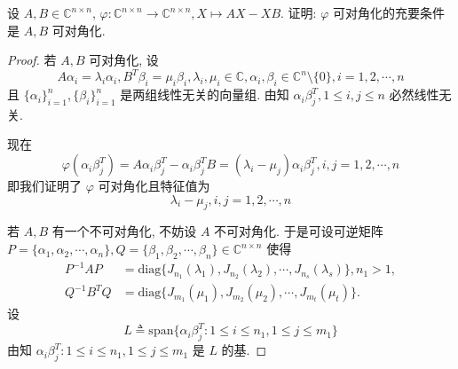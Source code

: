 \documentclass[../../main.tex]{subfiles}
\begin{document}
\begin{example}
设 $A, B \in \mathbb{C}^{n \times n}$, $\varphi : \mathbb{C}^{n \times n} \to \mathbb{C}^{n \times n}, X \mapsto AX - XB$. 证明: $\varphi$ 可对角化的充要条件是 $A, B$ 可对角化.
\end{example}
\begin{proof}
若 $A, B$ 可对角化, 设
$$A\alpha_i = \lambda_i \alpha_i, B^T \beta_i = \mu_i \beta_i, \lambda_i, \mu_i \in \mathbb{C}, \alpha_i, \beta_i \in \mathbb{C}^n \setminus \{0\}, i = 1, 2, \cdots, n$$
且 $\{\alpha_i\}_{i=1}^n, \{\beta_i\}_{i=1}^n$ 是两组线性无关的向量组. 由知 $\alpha_i \beta_j^T, 1 \leqslant  i, j \leqslant  n$ 必然线性无关.

现在
$$\varphi(\alpha_i \beta_j^T) = A\alpha_i \beta_j^T - \alpha_i \beta_j^T B = (\lambda_i - \mu_j) \alpha_i \beta_j^T, i, j = 1, 2, \cdots, n$$
即我们证明了 $\varphi$ 可对角化且特征值为
$$\lambda_i - \mu_j, i, j = 1, 2, \cdots, n$$

若 $A, B$ 有一个不可对角化, 不妨设 $A$ 不可对角化. 于是可设可逆矩阵 $P = \{\alpha_1, \alpha_2, \cdots, \alpha_n\}, Q = \{\beta_1, \beta_2, \cdots, \beta_n\} \in \mathbb{C}^{n \times n}$ 使得
\begin{align*}
P^{-1}AP &= \mathrm{diag}\{J_{n_1}(\lambda_1), J_{n_2}(\lambda_2), \cdots, J_{n_s}(\lambda_s)\}, n_1 > 1, \\
Q^{-1}B^T Q &= \mathrm{diag}\{J_{m_1}(\mu_1), J_{m_2}(\mu_2), \cdots, J_{m_t}(\mu_t)\}.
\end{align*}
设
$$L \triangleq \mathrm{span}\{\alpha_i \beta_j^T : 1 \leqslant  i \leqslant  n_1, 1 \leqslant  j \leqslant  m_1\}$$
由知 $\alpha_i \beta_j^T : 1 \leqslant  i \leqslant  n_1, 1 \leqslant  j \leqslant  m_1$ 是 $L$ 的基.


\end{proof}
\end{document}
